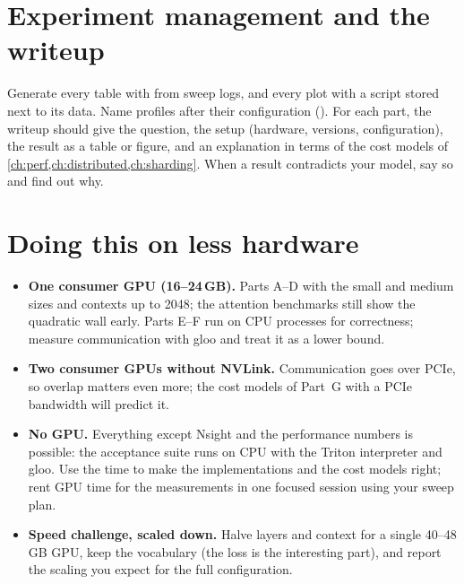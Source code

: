 \section{Experiment management and the writeup}\label{sec:proj2:writeup}

Generate every table with  from sweep logs, and every plot with a script stored next to
its data. Name profiles after their configuration (). For each
part, the writeup should give the question, the setup (hardware, versions, configuration), the
result as a table or figure, and an explanation in terms of the cost models of
\cref{ch:perf,ch:distributed,ch:sharding}. When a result contradicts your model, say so and find out
why.

\section{Doing this on less hardware}\label{sec:proj2:small}

\begin{itemize}
\item \textbf{One consumer GPU (16--24\,GB).} Parts A--D with the small and medium sizes and
  contexts up to 2048; the attention benchmarks still show the quadratic wall early. Parts E--F run on
  CPU processes for correctness; measure communication with gloo and treat it as a lower bound.
\item \textbf{Two consumer GPUs without NVLink.} Communication goes over PCIe, so overlap
  matters even more; the cost models of Part~G with a PCIe bandwidth will predict it.
\item \textbf{No GPU.} Everything except Nsight and the performance numbers is possible: the
  acceptance suite runs on CPU with the Triton interpreter and gloo. Use the time to make the
  implementations and the cost models right; rent GPU time for the measurements in one focused
  session using your sweep plan.
\item \textbf{Speed challenge, scaled down.} Halve layers and context for a single 40--48\,GB GPU,
  keep the vocabulary (the loss is the interesting part), and report the scaling you expect for the
  full configuration.
\end{itemize}
